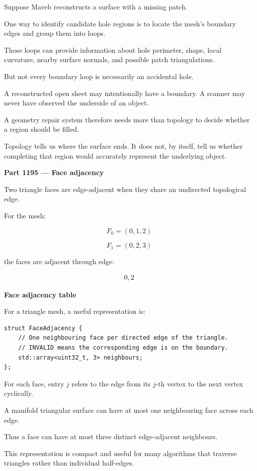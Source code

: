Suppose Maveb reconstructs a surface with a missing patch.

One way to identify candidate hole regions is to locate the mesh's boundary edges and group them into loops.

Those loops can provide information about hole perimeter, shape, local curvature, nearby surface normals, and possible patch triangulations.

But not every boundary loop is necessarily an accidental hole.

A reconstructed open sheet may intentionally have a boundary. A scanner may never have observed the underside of an object.

A geometry repair system therefore needs more than topology to decide whether a region should be filled.

Topology tells us where the surface ends. It does not, by itself, tell us whether completing that region would accurately represent the underlying object.

\textbf{Part 1195 --- Face adjacency}

Two triangle faces are edge-adjacent when they share an undirected topological edge.

For the mesh:

\[
F_0=(0,1,2)
\]

\[
F_1=(0,2,3)
\]

the faces are adjacent through edge:

\[
\\{0,2\\}
\]

\textbf{Face adjacency table}

For a triangle mesh, a useful representation is:

\begin{verbatim}
struct FaceAdjacency {
    // One neighbouring face per directed edge of the triangle.
    // INVALID means the corresponding edge is on the boundary.
    std::array<uint32_t, 3> neighbours;
};
\end{verbatim}

For each face, entry \(j\) refers to the edge from its \(j\)-th vertex to the next vertex cyclically.

A manifold triangular surface can have at most one neighbouring face across each edge.

Thus a face can have at most three distinct edge-adjacent neighbours.

This representation is compact and useful for many algorithms that traverse triangles rather than individual half-edges.

